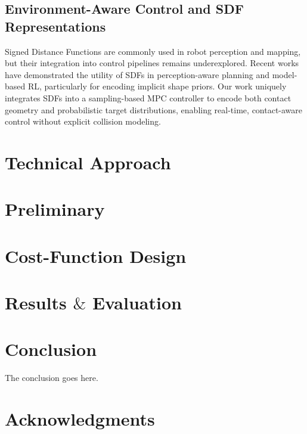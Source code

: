 \documentclass[conference]{IEEEtran}
\begin{document}
\subsection{Environment-Aware Control and SDF Representations}

Signed Distance Functions are commonly used in robot perception and mapping, but their integration into control pipelines remains underexplored. Recent works have demonstrated the utility of SDFs in perception-aware planning and model-based RL, particularly for encoding implicit shape priors. Our work uniquely integrates SDFs into a sampling-based MPC controller to encode both contact geometry and probabilistic target distributions, enabling real-time, contact-aware control without explicit collision modeling.


\section{Technical Approach}

\section{Preliminary}


\section{Cost-Function Design}



\section{Results $\&$ Evaluation}





\section{Conclusion} 
\label{sec:conclusion}
The conclusion goes here.


\section*{Acknowledgments}
\end{document}
